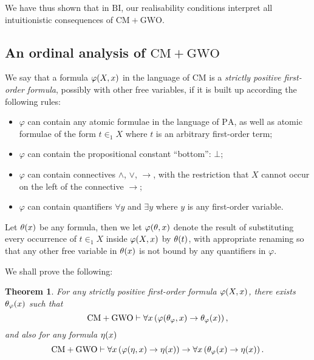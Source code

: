 \documentclass[11pt]{article}
\theoremstyle{plain}
\newtheorem{theorem}{Theorem}[section]
\theoremstyle{definition}
\begin{document}
We have thus shown that in $\mathrm{BI}$, our realisability conditions interpret all intuitionistic consequences of $\mathrm{CM} + \mathrm{GWO}$.

\subsection{An ordinal analysis of \texorpdfstring{$\mathrm{CM} + \mathrm{GWO}$}{CM + GWO}}

We say that a formula $\varphi\mleft(X, x\mright)$ in the language of $\mathrm{CM}$ is a \emph{strictly positive first-order formula}, possibly with other free variables, if it is built up according the following rules:
\begin{itemize}
    \item $\varphi$ can contain any atomic formulae in the language of $\mathrm{PA}$, as well as atomic formulae of the form $t \in_1 X$ where $t$ is an arbitrary first-order term;
    \item $\varphi$ can contain the propositional constant ``bottom'': $\bot$;
    \item $\varphi$ can contain connectives $\land$, $\lor$, $\rightarrow$, with the restriction that $X$ cannot occur on the left of the connective $\rightarrow$;
    \item $\varphi$ can contain quantifiers $\forall y$ and $\exists y$ where $y$ is any first-order variable.
\end{itemize}

Let $\theta\mleft(x\mright)$ be any formula, then we let $\varphi\mleft(\theta, x\mright)$ denote the result of substituting every occurrence of $t \in_1 X$ inside $\varphi\mleft(X, x\mright)$ by $\theta\mleft(t\mright)$, with appropriate renaming so that any other free variable in $\theta\mleft(x\mright)$ is not bound by any quantifiers in $\varphi$.

We shall prove the following:

\begin{theorem}
    \label{thm:inductive-definition}
    For any strictly positive first-order formula $\varphi\mleft(X, x\mright)$, there exists $\theta_\varphi\mleft(x\mright)$ such that
    \[\mathrm{CM} + \mathrm{GWO} \vdash \forall x \left(\varphi\mleft(\theta_\varphi, x\mright) \rightarrow \theta_\varphi\mleft(x\mright)\right),\]
    and also for any formula $\eta\mleft(x\mright)$
    \[\mathrm{CM} + \mathrm{GWO} \vdash \forall x \left(\varphi\mleft(\eta, x\mright) \rightarrow \eta\mleft(x\mright)\right) \rightarrow \forall x \left(\theta_\varphi\mleft(x\mright) \rightarrow \eta\mleft(x\mright)\right).\]
\end{theorem}
\end{document}
